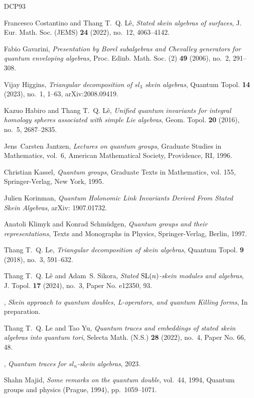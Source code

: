\documentclass[11pt]{amsart}
\theoremstyle{plain}
\theoremstyle{definition}
\begin{document}
\begin{thebibliography}{DCP93}

Francesco Costantino and Thang T.~Q. L\^{e}, \emph{Stated skein algebras of
  surfaces}, J. Eur. Math. Soc. (JEMS) \textbf{24} (2022), no.~12, 4063--4142.


Fabio Gavarini, \emph{Presentation by {B}orel subalgebras and {C}hevalley
  generators for quantum enveloping algebras}, Proc. Edinb. Math. Soc. (2)
  \textbf{49} (2006), no.~2, 291--308.

Vijay Higgins, \emph{Triangular decomposition of $sl_3$ skein algebras},
  Quantum Topol. \textbf{14} (2023), no.~1, 1--63, arXiv:2008.09419.

Kazuo Habiro and Thang T.~Q. L\^e, \emph{Unified quantum invariants for
  integral homology spheres associated with simple {L}ie algebras}, Geom.
  Topol. \textbf{20} (2016), no.~5, 2687--2835.

Jens~Carsten Jantzen, \emph{Lectures on quantum groups}, Graduate Studies in
  Mathematics, vol.~6, American Mathematical Society, Providence, RI, 1996.

Christian Kassel, \emph{Quantum groups}, Graduate Texts in Mathematics, vol.
  155, Springer-Verlag, New York, 1995.
  
Julien Korinman, \emph{Quantum Holonomic Link Invariants Derived From Stated Skein
Algebras}, arXiv: 1907.01732.

Anatoli Klimyk and Konrad Schm\"{u}dgen, \emph{Quantum groups and their
  representations}, Texts and Monographs in Physics, Springer-Verlag, Berlin,
  1997.

Thang T.~Q. Le, \emph{Triangular decomposition of skein algebras}, Quantum
  Topol. \textbf{9} (2018), no.~3, 591--632.

Thang T.~Q. L\^e and Adam~S. Sikora, \emph{Stated {${\rm SL}(n)$}-skein modules
  and algebras}, J. Topol. \textbf{17} (2024), no.~3, Paper No. e12350, 93.

\bysame, \emph{Skein approach to quantum doubles, L-operators, and quantum
  Killing forms}, In preparation.

Thang T.~Q. Le and Tao Yu, \emph{Quantum traces and embeddings of stated skein
  algebras into quantum tori}, Selecta Math. (N.S.) \textbf{28} (2022), no.~4,
  Paper No. 66, 48.

\bysame, \emph{Quantum traces for $sl_n$-skein algebras}, 2023.

Shahn Majid, \emph{Some remarks on the quantum double}, vol.~44, 1994, Quantum
  groups and physics (Prague, 1994), pp.~1059--1071.

\end{thebibliography}
\end{document}
